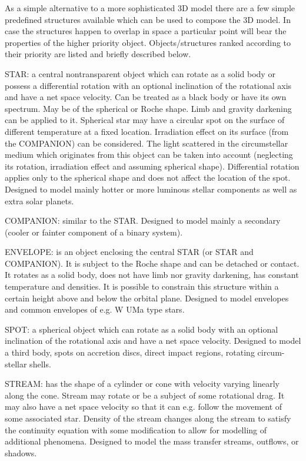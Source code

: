 \documentclass[11pt,twoside]{article}
\begin{document}
As a simple alternative to a more sophisticated 3D model
there are a few simple predefined structures available which can be 
used to compose the 3D model. 
In case the structures happen to overlap in space a particular point
will bear the properties of the higher priority object.
Objects/structures ranked according to their priority are listed
and briefly described below.

STAR:
a central nontransparent object which can rotate as a solid body
or possess a differential rotation with an optional inclination of 
the rotational axis and have a net space velocity. 
Can be treated as a black body or have its own spectrum. 
May be of the spherical or Roche shape.
Limb and gravity darkening can be applied to it. 
Spherical star may have a circular spot on the surface of different
temperature at a fixed location.
Irradiation effect on its surface (from the COMPANION)
can be considered.
The light scattered in the circumstellar medium which originates from 
this object can be taken into account
(neglecting its rotation, irradiation effect and assuming
spherical shape).  
Differential rotation applies only to the spherical shape and
does not affect the location of the spot. 
Designed to model mainly hotter or more luminous stellar components
as well as extra solar planets.

COMPANION: 
similar to the STAR.
Designed to model mainly a secondary (cooler or fainter component 
of a binary system).

ENVELOPE:
is an object enclosing the central STAR (or STAR and COMPANION). 
It is subject to the Roche shape and can be detached or contact. 
It rotates as a solid body, does not have limb nor gravity darkening, 
has constant temperature and densities.
It is possible to constrain this structure within a certain
height above and below the orbital plane. 
Designed to model envelopes and common envelopes of 
e.g. W UMa type stars.

SPOT: 
a spherical object which can rotate as a solid body with an optional 
inclination of the rotational axis and have a net space velocity. 
Designed to model a third body, spots on accretion discs, direct impact
regions, rotating circum-stellar shells. 

STREAM:
has the shape of a cylinder or cone with velocity varying linearly 
along the cone. 
Stream may rotate or be a subject of some rotational drag.
It may also have a net space velocity so that it can e.g. follow 
the movement of some associated star.
Density of the stream changes along the stream
to satisfy the continuity equation with some
modification to allow for modelling of additional phenomena.
Designed to model the mass transfer streams, outflows, or shadows.
\end{document}
